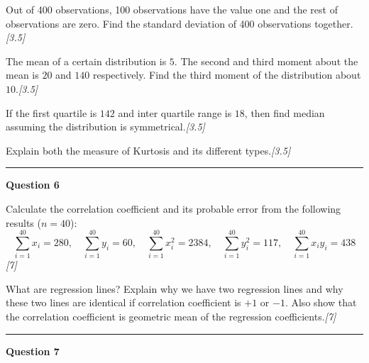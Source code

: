 \documentclass[11pt,a4paper]{article}
\newcommand{\pts}[1]{\hfill   \textit{[#1]}}
\begin{document}
\begin{parts}
  \item Out of 400 observations, 100 observations have the value one and the rest of observations are zero. Find the standard deviation of 400 observations together.\pts{3.5}
  \item The mean of a certain distribution is $5$. The second and third moment about the mean is $20$ and $140$ respectively. Find the third moment of the distribution about $10$.\pts{3.5}
  \item If the first quartile is $142$ and inter quartile range is $18$, then find median assuming the distribution is symmetrical.\pts{3.5}
  \item Explain both the measure of Kurtosis and its different types.\pts{3.5}
\end{parts}

\medskip\rule{\linewidth}{0.2pt}\medskip




\noindent   \textbf{Question 6}

\begin{parts}
  \item Calculate the correlation coefficient and its probable error from the following results ($n = 40$):
  \[ \sum_{i=1}^{40} x_i = 280, \quad \sum_{i=1}^{40} y_i = 60, \quad \sum_{i=1}^{40} x_i^2 = 2384, \quad \sum_{i=1}^{40} y_i^2 = 117, \quad \sum_{i=1}^{40} x_i y_i = 438 \] \pts{7}
  \item What are regression lines? Explain why we have two regression lines and why these two lines are identical if correlation coefficient is $+1$ or $-1$. Also show that the correlation coefficient is geometric mean of the regression coefficients.\pts{7}
\end{parts}

\medskip\rule{\linewidth}{0.2pt}\medskip




\noindent   \textbf{Question 7}
\end{document}
